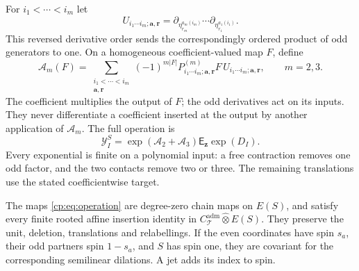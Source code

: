 For \(i_1<\cdots<i_m\) let
\[
 U_{i_1\cdots i_m;\mathbf a,\mathbf r}
 =\partial_{\eta_{r_m}^{a_m(i_m)}}\cdots
                  \partial_{\eta_{r_1}^{a_1(i_1)}}.
\]
This reversed derivative order sends the correspondingly ordered
product of odd generators to one.  On a homogeneous
coefficient-valued map \(F\), define
\begin{equation}\label{cp:eq:contact-operator}
 \mathscr A_m(F)=
 \sum_{\substack{i_1<\cdots<i_m\\\mathbf a,\mathbf r}}
 (-1)^{m|F|}
 P^{(m)}_{i_1\cdots i_m;\mathbf a,\mathbf r}
 F\,U_{i_1\cdots i_m;\mathbf a,\mathbf r},
 \qquad m=2,3.
\end{equation}
The coefficient multiplies the output of \(F\); the odd derivatives
act on its inputs.  They never differentiate a coefficient inserted
at the output by another application of \(\mathscr A_m\).
The full operation is
\begin{equation}\label{cp:eq:operation}
 \mathcal Y_I^S
      =\exp(\mathscr A_2+\mathscr A_3)
                         \mathsf E_{\mathbf z}\exp(D_I).
\end{equation}
Every exponential is finite on a polynomial input: a free contraction
removes one odd factor, and the two contacts remove two or three.
The remaining translations use the stated coefficientwise target.

\begin{proposition}
\label{cp:prop:cubic}
The maps \eqref{cp:eq:operation} are degree-zero chain maps on
\(E(S)\), and satisfy every finite rooted affine insertion identity
in \(C_{\mathcal T}^{\mathrm{adm}}\widehat\otimes E(S)\).
They preserve the unit, deletion, translations and relabellings.
If the even coordinates have spin \(s_a\), their odd partners spin
\(1-s_a\), and \(S\) has spin one, they are covariant for the
corresponding semilinear dilations.  A jet adds its index to spin.
\end{proposition}

